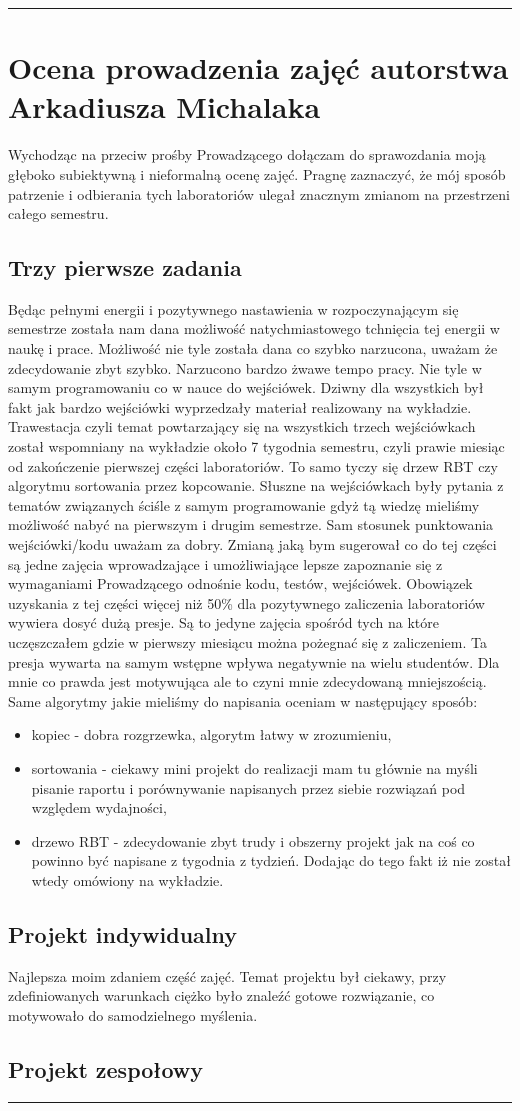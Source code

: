 \documentclass[a4paper,11pt]{article}
\newcommand{\linia}{\rule{\linewidth}{0.4mm}}
\begin{document}
\noindent\linia
\section{Ocena prowadzenia zajęć autorstwa Arkadiusza Michalaka}
Wychodząc na przeciw prośby Prowadzącego dołączam do sprawozdania moją głęboko subiektywną i nieformalną ocenę zajęć. Pragnę zaznaczyć, że mój sposób patrzenie i odbierania tych laboratoriów ulegał znacznym zmianom na przestrzeni całego semestru. 
\subsection{Trzy pierwsze zadania}
Będąc pełnymi energii i pozytywnego nastawienia w rozpoczynającym się semestrze została nam dana możliwość natychmiastowego tchnięcia tej energii w naukę i prace. Możliwość nie tyle została dana co szybko narzucona, uważam że zdecydowanie zbyt szybko. Narzucono bardzo żwawe tempo pracy. Nie tyle w samym programowaniu co w nauce do wejściówek. Dziwny dla wszystkich był fakt jak bardzo wejściówki wyprzedzały materiał realizowany na wykładzie. Trawestacja czyli temat powtarzający się na wszystkich trzech wejściówkach został wspomniany na wykładzie około 7 tygodnia semestru, czyli prawie miesiąc od zakończenie pierwszej części laboratoriów. To samo tyczy się drzew RBT czy algorytmu sortowania przez kopcowanie. Słuszne na wejściówkach były pytania z tematów związanych ściśle z samym programowanie gdyż tą wiedzę mieliśmy możliwość nabyć na pierwszym i drugim semestrze. Sam stosunek punktowania wejściówki/kodu uważam za dobry. Zmianą jaką bym sugerował co do tej części są jedne zajęcia wprowadzające i umożliwiające lepsze zapoznanie się z wymaganiami Prowadzącego odnośnie kodu, testów, wejściówek. Obowiązek uzyskania z tej części więcej niż 50\% dla pozytywnego zaliczenia laboratoriów wywiera dosyć dużą presje. Są to jedyne zajęcia spośród tych na które uczęszczałem gdzie w pierwszy miesiącu można pożegnać się z zaliczeniem. Ta presja wywarta na samym wstępne wpływa negatywnie na wielu studentów. Dla mnie co prawda jest motywująca ale to czyni mnie zdecydowaną mniejszością. Same algorytmy jakie mieliśmy do napisania oceniam w następujący sposób:
\begin{itemize}
\item kopiec - dobra rozgrzewka, algorytm łatwy w zrozumieniu,
\item sortowania - ciekawy mini projekt do realizacji mam tu głównie na myśli pisanie raportu i porównywanie napisanych przez siebie rozwiązań pod względem wydajności,
\item drzewo RBT - zdecydowanie zbyt trudy i obszerny projekt jak na coś co powinno być napisane z tygodnia z tydzień. Dodając do tego fakt iż nie został wtedy omówiony na wykładzie.
\end{itemize}
\subsection{Projekt indywidualny}
Najlepsza moim zdaniem część zajęć. Temat projektu był ciekawy, przy zdefiniowanych warunkach ciężko było znaleźć gotowe rozwiązanie, co motywowało do samodzielnego myślenia.
\subsection{Projekt zespołowy}

\noindent\linia
\end{document}
